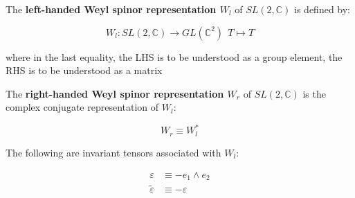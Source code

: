 \begin{defn}

    The \textbf{left-handed Weyl spinor representation $W_l$} of $SL(2, \mathbb{C})$ is defined by:

    $$ W_l: SL(2, \mathbb{C}) \to GL(\mathbb{C}^2)  ~~ T \mapsto T $$

    where in the last equality, the LHS is to be understood as a group element, the RHS is to be understood as a matrix

\end{defn}

\begin{defn}

    The \textbf{right-handed Weyl spinor representation $W_r$} of $SL(2, \mathbb{C})$ is the complex conjugate representation of $W_l$:

    $$ W_r \equiv W_l ^ *$$


\end{defn}


\begin{thm}
    The following are invariant tensors associated with $W_l$:

    \begin{align*}
               \varepsilon &\equiv  - e_1 \wedge e_2 \\
        \tilde \varepsilon &\equiv  - \varepsilon
    \end{align*}

\end{thm}